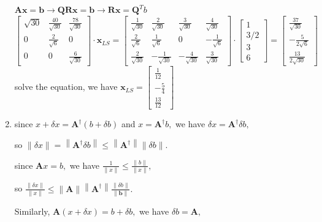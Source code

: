 \documentclass[english,onecolumn]{IEEEtran}
\begin{document}
\begin{enumerate}
$
\mathbf{A x}=\mathbf{b} \rightarrow \mathbf{Q} \mathbf{R} \mathbf{x}=\mathbf{b} \rightarrow \mathbf{R} \mathbf{x}=\mathbf{Q}^{T} b
$
$$
\left[\begin{array}{ccc}
	\sqrt{30} & \frac{40}{\sqrt{30}} & \frac{78}{\sqrt{30}} \\
	0 & \frac{2}{\sqrt{6}} & 0 \\
	0 & 0 & \frac{6}{\sqrt{30}}
\end{array}\right] \cdot \mathbf{x}_{L S}=\left[\begin{array}{cccc}
	\frac{1}{\sqrt{30}} & \frac{2}{\sqrt{30}} & \frac{3}{\sqrt{30}} & \frac{4}{\sqrt{30}} \\
	\frac{2}{\sqrt{6}} & \frac{1}{\sqrt{6}} & 0 & -\frac{1}{\sqrt{6}} \\
	\frac{2}{\sqrt{30}} & -\frac{1}{\sqrt{30}} & -\frac{4}{\sqrt{30}} & \frac{3}{\sqrt{30}}
\end{array}\right] \cdot\left[\begin{array}{c}
	1 \\
	3 / 2 \\
	3 \\
	6
\end{array}\right]=\left[\begin{array}{c}
	\frac{37}{\sqrt{30}} \\
	-\frac{5}{2 \sqrt{6}} \\
	\frac{13}{2 \sqrt{30}}
\end{array}\right]
$$
solve the equation, we have $\mathbf{x}_{L S}=\left[\begin{array}{c}\frac{1}{12} \\ -\frac{5}{4} \\ \frac{13}{12}\end{array}\right]$

	\item since $x+\delta x=\mathbf{A}^{\dagger}(b+\delta b)$ and $x=\mathbf{A}^{\dagger} b,$ we have $\delta x=\mathbf{A}^{\dagger} \delta b,$
	
	 so $\|\delta x\|=\left\|\mathbf{A}^{\dagger} \delta b\right\| \leq\left\|\mathbf{A}^{\dagger}\right\|\|\delta b\|$.
	 
	since $\mathbf{A} x=b,$ we have $\frac{1}{\|x\|} \leq \frac{\|b\|}{\|x\|},$ 
	
	so $\frac{\|\delta x\|}{\|x\|} \leq\|\mathbf{A}\|\left\|\mathbf{A}^{\dagger}\right\| \frac{\|\delta b\|}{\|\mathbf{b}\|} .$
	
	Similarly, $\mathbf{A}(x+\delta x)=b+\delta b,$ we have $\delta b=\mathbf{A},$ 
	

\end{enumerate}
\end{document}
